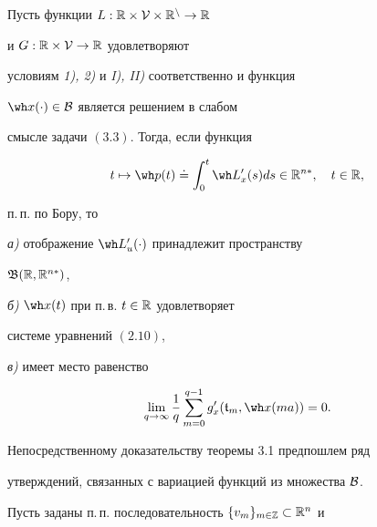 \begin{thms}


Пусть функции $L:\Bbb R\times\cal V\times\Bbb R^n\to\Bbb R$


и $G:\Bbb R\times\cal V\to\Bbb R$ удовлетворяют


условиям {\em 1), 2)} и {\em I), II)} соответственно и функция


$\wh x(\cdot)\in\cal B$ является решением в слабом


смысле задачи $(3.3)$. Тогда, если функция


\begin{equation}


t\mapsto\wh p(t)\doteq \int_0^t\wh


L'_x(s)ds\in\Bbb R^{n*},\quad t\in\Bbb R,


\end{equation}


п.\,п. по Бору, то





{\em а)} отображение $\wh L'_u(\cdot)$ принадлежит пространству


$\frak B(\Bbb R,\Bbb R^{n*})$,





{\em б)} $\wh x(t)$ при п.\,в. $t\in\Bbb R$ удовлетворяет


системе уравнений $(2.10)$,





{\em в)} имеет место равенство


\begin{equation}


\lim_{q\to\infty}\frac{1}{q}\sum_{m=0}^{q-1}


g'_x(\frak t_m,\wh x(ma))=0.


\end{equation}


\end{thms}





Непосредственному доказательству теоремы 3.1 предпошлем ряд


утверждений, связанных с вариацией функций из множества $\cal B$.





Пусть заданы п.\,п. последовательность $\{v_m\}_{m\in\Bbb Z}\subset\Bbb R^n$ и


